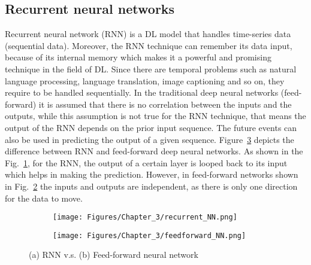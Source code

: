 \subsection{Recurrent neural networks}
\label{sec222}
Recurrent neural network (RNN) is a DL model that handles time-series data (sequential data).
Moreover, the RNN technique can remember its data input, because of its internal memory which makes it a powerful and promising technique in the field of DL.
Since there are temporal problems such as natural language processing, language translation, image captioning and so on, they require to be handled sequentially.
In the traditional deep neural networks (feed-forward) it is assumed that there is no correlation between the inputs and the outputs, while this assumption is not true for the RNN technique, that means the output of the RNN depends on the prior input sequence.
The future events can also be used in predicting the output of a given sequence.
Figure~\ref{fig:rnn_vs_FFNN} depicts the difference between RNN and feed-forward deep neural networks.
As shown in the Fig.~\ref{fig:rrn}, for the RNN, the output of a certain layer is looped back to its input which helps in making the prediction.
However, in feed-forward networks shown in Fig.~\ref{fig:FFNN} the inputs and outputs are independent, as there is only one direction for the data to move.
\begin{figure}[!ht]
	\centering
	\begin{subfigure}{0.49\textwidth}		
		\centering
		\texttt{[image: Figures/Chapter\_3/recurrent\_NN.png]}
		\caption{} 
		\label{fig:rrn}
	\end{subfigure}
	\hfill
	\begin{subfigure}{0.49\textwidth}
		\centering
		\texttt{[image: Figures/Chapter\_3/feedforward\_NN.png]}
		\caption{} 
		\label{fig:FFNN}
	\end{subfigure}	
	\caption{(a) RNN v.s. (b) Feed-forward neural network}
	\label{fig:rnn_vs_FFNN}
\end{figure}

